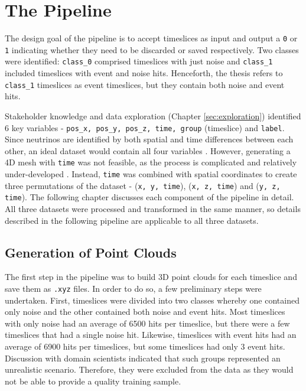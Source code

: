 \chapter{The Pipeline}
\label{sec:pipeline}

\ifpdf
    \graphicspath{{5_pipeline/figures/PNG/}{5_pipeline/figures/PDF/}{5_pipeline/figures/}}
\else
    \graphicspath{{5_pipeline/figures/EPS/}{5_pipeline/figures/}}
\fi

The design goal of the pipeline is to accept timeslices as input and output a \texttt{0} or \texttt{1} indicating whether they need to be discarded or saved respectively. Two classes were identified: \texttt{class\_0} comprised timeslices with just noise and \texttt{class\_1} included timeslices with event and noise hits. Henceforth, the thesis refers to \texttt{class\_1} timeslices as event timeslices, but they contain both noise and event hits.

Stakeholder knowledge and data exploration (Chapter \ref{sec:exploration}) identified 6 key variables - \texttt{pos\_x, pos\_y, pos\_z, time, group} (timeslice) and \texttt{label}. Since neutrinos are identified by both spatial and time differences between each other, an ideal dataset would contain all four variables \cite{km3net_2017}. However, generating a 4D mesh with \texttt{time} was not feasible, as the process is complicated and relatively under-developed \cite{otomo2014direct}. Instead, \texttt{time} was combined with spatial coordinates to create three permutations of the dataset - (\texttt{x, y, time}), (\texttt{x, z, time}) and (\texttt{y, z, time}). The following chapter discusses each component of the pipeline in detail. All three datasets were processed and transformed in the same manner, so details described in the following pipeline are applicable to all three datasets.

\section{Generation of Point Clouds}
The first step in the pipeline was to build 3D point clouds for each timeslice and save them as \texttt{.xyz} files. In order to do so, a few preliminary steps were undertaken. First, timeslices were divided into two classes whereby one contained only noise and the other contained both noise and event hits. Most timeslices with only noise had an average of 6500 hits per timeslice, but there were a few timeslices that had a single noise hit. Likewise, timeslices with event hits had an average of 6900 hits per timeslices, but some timeslices had only 3 event hits. Discussion with domain scientists indicated that such groups represented an unrealistic scenario. Therefore, they were excluded from the data as they would not be able to provide a quality training sample.

